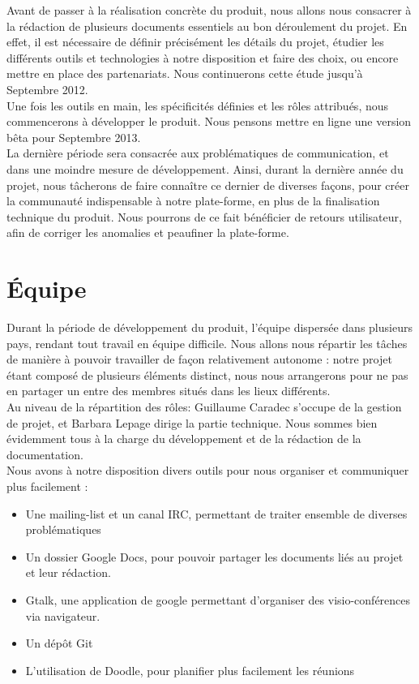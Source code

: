\documentclass{life-fr}
\begin{document}
Avant de passer à la réalisation concrète du produit, nous allons nous consacrer à la rédaction de plusieurs documents essentiels au bon déroulement du projet. En effet, il est nécessaire de définir précisément les détails du projet, étudier les différents outils et technologies à notre disposition et faire des choix, ou encore mettre en place des partenariats. Nous continuerons cette étude jusqu'à Septembre 2012.\\

Une fois les outils en main, les spécificités définies et les rôles attribués, nous commencerons à développer le produit. Nous pensons mettre en ligne une version bêta pour Septembre 2013.\\

La dernière période sera consacrée aux problématiques de communication, et dans une moindre mesure de développement. Ainsi, durant la dernière année du projet, nous tâcherons de faire connaître ce dernier de diverses façons, pour créer la communauté indispensable à notre plate-forme, en plus de la finalisation technique du produit. Nous pourrons de ce fait bénéficier de retours utilisateur, afin de corriger les anomalies et peaufiner la plate-forme.

\section{Équipe}

Durant la période de développement du produit, l'équipe dispersée dans plusieurs pays, rendant tout travail en équipe difficile. Nous allons nous répartir les tâches de manière à pouvoir travailler de façon relativement autonome : notre projet étant composé de plusieurs éléments distinct, nous nous arrangerons pour ne pas en partager un entre des membres situés dans les lieux différents.\\

Au niveau de la répartition des rôles: Guillaume Caradec s'occupe de la gestion de projet, et Barbara Lepage dirige la partie technique. Nous sommes bien évidemment tous à la charge du développement et de la rédaction de la documentation.\\

Nous avons à notre disposition divers outils pour nous organiser et communiquer plus facilement :\\

\begin{itemize}
  \item Une mailing-list et un canal IRC, permettant de traiter ensemble de diverses problématiques
  \item Un dossier Google Docs, pour pouvoir partager les documents liés au projet et leur rédaction.
  \item Gtalk, une application de google permettant d'organiser des visio-conférences via navigateur.
  \item Un dépôt Git
  \item L'utilisation de Doodle, pour planifier plus facilement les réunions
\end{itemize}
\end{document}
